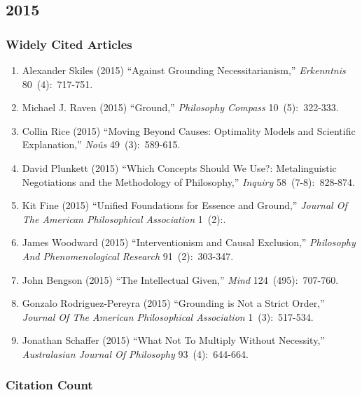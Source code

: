 \documentclass[
  10pt,
  letterpaper,
  DIV=11,
  numbers=noendperiod,
  twoside]{scrartcl}
\providecommand{\tightlist}{%
  \setlength{\itemsep}{0pt}\setlength{\parskip}{0pt}}\usepackage{longtable,booktabs,array}
\begin{document}
\newpage

\subsection{2015}\label{sec-s2015}

\subsubsection*{Widely Cited Articles}\label{widely-cited-articles-59}

\begin{enumerate}
\def\labelenumi{\arabic{enumi}.}
\tightlist
\item
  Alexander Skiles (2015) ``Against Grounding Necessitarianism,''
  \emph{Erkenntnis} 80~(4):~717-751.
\item
  Michael J. Raven (2015) ``Ground,'' \emph{Philosophy Compass}
  10~(5):~322-333.
\item
  Collin Rice (2015) ``Moving Beyond Causes: Optimality Models and
  Scientific Explanation,'' \emph{Noûs} 49~(3):~589-615.
\item
  David Plunkett (2015) ``Which Concepts Should We Use?: Metalinguistic
  Negotiations and the Methodology of Philosophy,'' \emph{Inquiry}
  58~(7-8):~828-874.
\item
  Kit Fine (2015) ``Unified Foundations for Essence and Ground,''
  \emph{Journal Of The American Philosophical Association} 1~(2):.
\item
  James Woodward (2015) ``Interventionism and Causal Exclusion,''
  \emph{Philosophy And Phenomenological Research} 91~(2):~303-347.
\item
  John Bengson (2015) ``The Intellectual Given,'' \emph{Mind}
  124~(495):~707-760.
\item
  Gonzalo Rodriguez-Pereyra (2015) ``Grounding is Not a Strict Order,''
  \emph{Journal Of The American Philosophical Association}
  1~(3):~517-534.
\item
  Jonathan Schaffer (2015) ``What Not To Multiply Without Necessity,''
  \emph{Australasian Journal Of Philosophy} 93~(4):~644-664.
\end{enumerate}

\subsubsection*{Citation Count}\label{sec-count-2015}
\end{document}
